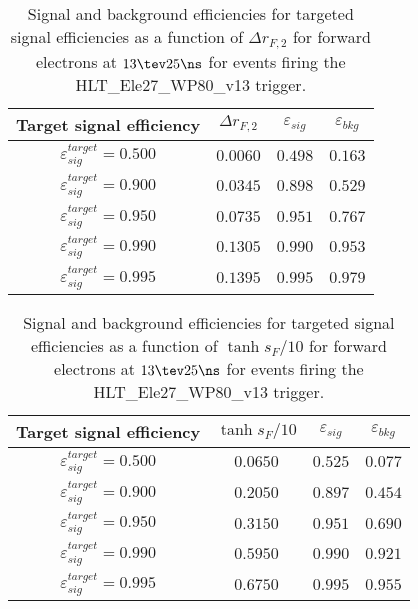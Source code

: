 \clearpage

\begin{table}[!bht]
  \begin{center}
    \begin{tabular}{cccc}
      \hline
      Target signal efficiency & $\Delta r_{F,2}$ & $\varepsilon_{sig}$ & $\varepsilon_{bkg}$ \\ 
      \hline
      $\varepsilon_{sig}^{target} = 0.500$ & $  0.0060$ & $0.498$ & $0.163$ \\
      $\varepsilon_{sig}^{target} = 0.900$ & $  0.0345$ & $0.898$ & $0.529$ \\
      $\varepsilon_{sig}^{target} = 0.950$ & $  0.0735$ & $0.951$ & $0.767$ \\
      $\varepsilon_{sig}^{target} = 0.990$ & $  0.1305$ & $0.990$ & $0.953$ \\
      $\varepsilon_{sig}^{target} = 0.995$ & $  0.1395$ & $0.995$ & $0.979$ \\
      \hline
    \end{tabular}
    \caption{Signal and background efficiencies for targeted signal efficiencies as a function of $\Delta r_{F,2}$ for forward electrons at $13\tev 25\ns$ for events firing the HLT\_Ele27\_WP80\_v13 trigger.}
    \label{tab:eff_rej_r2F_beam_13_25_trigger_27_F}
  \end{center}
\end{table}

\clearpage

\begin{table}[!bht]
  \begin{center}
    \begin{tabular}{cccc}
      \hline
      Target signal efficiency & $\tanh{s_F/10}$ & $\varepsilon_{sig}$ & $\varepsilon_{bkg}$ \\ 
      \hline
      $\varepsilon_{sig}^{target} = 0.500$ & $  0.0650$ & $0.525$ & $0.077$ \\
      $\varepsilon_{sig}^{target} = 0.900$ & $  0.2050$ & $0.897$ & $0.454$ \\
      $\varepsilon_{sig}^{target} = 0.950$ & $  0.3150$ & $0.951$ & $0.690$ \\
      $\varepsilon_{sig}^{target} = 0.990$ & $  0.5950$ & $0.990$ & $0.921$ \\
      $\varepsilon_{sig}^{target} = 0.995$ & $  0.6750$ & $0.995$ & $0.955$ \\
      \hline
    \end{tabular}
    \caption{Signal and background efficiencies for targeted signal efficiencies as a function of $\tanh{s_F/10}$ for forward electrons at $13\tev 25\ns$ for events firing the HLT\_Ele27\_WP80\_v13 trigger.}
    \label{tab:eff_rej_sF_beam_13_25_trigger_27_F}
  \end{center}
\end{table}

\clearpage